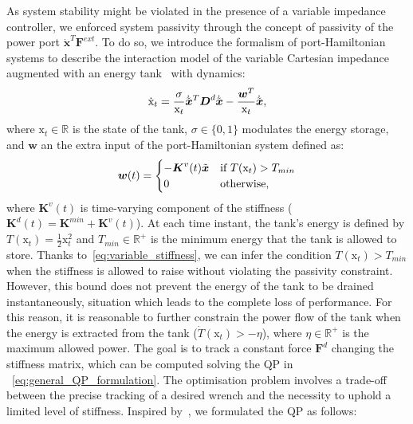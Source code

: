 As system stability might be violated in the presence of a variable impedance controller, we enforced system passivity through the concept of passivity of the power port $\dot{\boldsymbol{x}}^T\boldsymbol{F}^{ext}$.
To do so, we introduce the formalism of port-Hamiltonian systems to describe the interaction model of the variable Cartesian impedance augmented with an energy tank~\cite{ferraguti2015energy} with dynamics:
\begin{equation}
    \dot{\textrm{x}}_t = \frac{\sigma}{\textrm{x}_t}\dot{\Tilde{\boldsymbol{x}}}^T\boldsymbol{D}^d\dot{\Tilde{\boldsymbol{x}}} - \frac{\boldsymbol{w}^T}{\textrm{x}_t}\dot{\Tilde{\boldsymbol{x}}},
\end{equation}
where $\textrm{x}_t \in \mathbb{R}$ is the state of the tank, $\sigma \in \{0,1\}$ modulates the energy storage, and $\boldsymbol{w}$ an the extra input of the port-Hamiltonian system defined as:
\begin{equation} \label{eq:variable_stiffness}
    \boldsymbol{w}(t) = \begin{cases} -\boldsymbol{K}^v(t)\Tilde{\boldsymbol{x}} & \mbox{if $T(\textrm{x}_t)>T_{min}$}  \\ 0 & \mbox{otherwise,} \end{cases}
\end{equation}
where $\boldsymbol{K}^v(t)$ is time-varying component of the stiffness
($\boldsymbol{K}^d(t) = \boldsymbol{K}^{min} + \boldsymbol{K}^v(t)$).
At each time instant, the tank's energy is defined by
$T(\textrm{x}_t)=\frac{1}{2}\textrm{x}_t^2$ and
$T_{min}\in\mathbb{R}^+$ is the minimum energy that the tank is
allowed to store. Thanks to~\eqref{eq:variable_stiffness}, we can
infer the condition $T(\textrm{x}_t)>T_{min}$ when the stiffness is
allowed to raise without violating the passivity constraint. However,
this bound does not prevent the energy of the tank to be drained
instantaneously, situation which leads to the complete loss of
performance. For this reason, it is reasonable to further constrain
the power flow of the tank when the energy is extracted from the tank
($\dot{T}(\textrm{x}_t) > - \eta \nonumber$), where
$\eta\in\mathbb{R}^+$ is the maximum allowed power.
The goal is to track a constant force $\boldsymbol{F}^d$ changing the stiffness matrix, which can be computed solving the QP in ~\eqref{eq:general_QP_formulation}. The optimisation problem involves a trade-off between the precise tracking of a desired wrench and the necessity to uphold a limited level of stiffness.
Inspired by~\cite{zhao2022hybrid}, we formulated the QP as follows:
